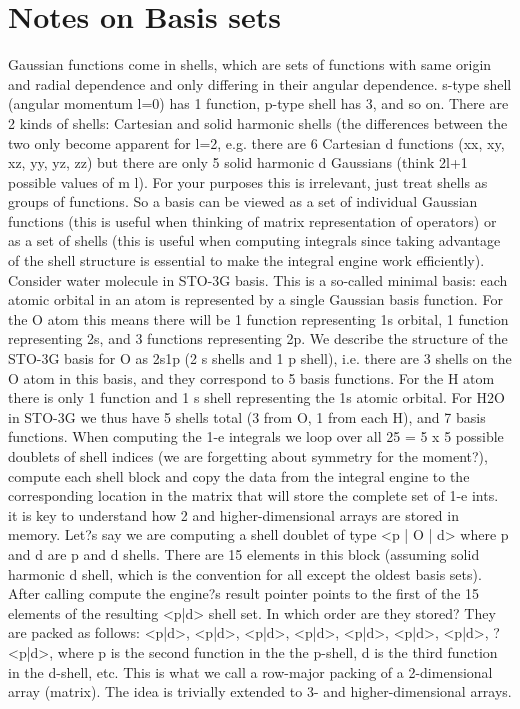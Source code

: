 \documentclass[11pt, oneside]{article}   	%
\begin{document}
\section{Notes on Basis sets}
Gaussian functions come in shells, which are sets of functions with same origin and radial dependence and only differing in their angular dependence. s-type shell (angular momentum l=0) has 1 function, p-type shell has 3, and so on. There are 2 kinds of shells: Cartesian and solid harmonic shells (the differences between the two only become apparent for l=2, e.g. there are 6 Cartesian d functions (xx, xy, xz, yy, yz, zz) but there are only 5 solid harmonic d Gaussians (think 2l+1 possible values of m \textunderscore l). For your purposes this is irrelevant, just treat shells as groups of functions.
So a basis can be viewed as a set of individual Gaussian functions (this is useful when thinking of matrix representation of operators) or as a set of shells (this is useful when computing integrals since taking advantage of the shell structure is essential to make the integral engine work efficiently). Consider water molecule in STO-3G basis. This is a so-called minimal basis: each atomic orbital in an atom is represented by a single Gaussian basis function. For the O atom this means there will be 1 function representing 1s orbital, 1 function representing 2s, and 3 functions representing 2p. We describe the structure of the STO-3G basis for O as 2s1p (2 s shells and 1 p shell), i.e. there are 3 shells on the O atom in this basis, and they correspond to 5 basis functions. For the H atom there is only 1 function and 1 s shell representing the 1s atomic orbital. For H2O in STO-3G we thus have 5 shells total (3 from O, 1 from each H), and 7 basis functions. When computing the 1-e integrals we loop over all 25 = 5 x 5 possible doublets of shell indices (we are forgetting about symmetry for the moment?), compute each shell block and copy the data from the integral engine to the corresponding location in the matrix that will store the complete set of 1-e ints.
it is key to understand how 2 and higher-dimensional arrays are stored in memory. Let?s say we are computing a shell doublet of type <p | O | d> where p and d are p and d shells. There are 15 elements in this block (assuming solid harmonic d shell, which is the convention for all except the oldest basis sets). After calling compute the engine?s result pointer points to the first of the 15 elements of the resulting <p|d> shell set. In which order are they stored? They are packed as follows: <p|d>, <p|d>, <p|d>, <p|d>, <p|d>, <p|d>, <p|d>, ? <p|d>, where p is the second function in the the p-shell, d is the third function in the d-shell, etc. This is what we call a row-major packing of a 2-dimensional array (matrix). The idea is trivially extended to 3- and higher-dimensional arrays.
\end{document}
